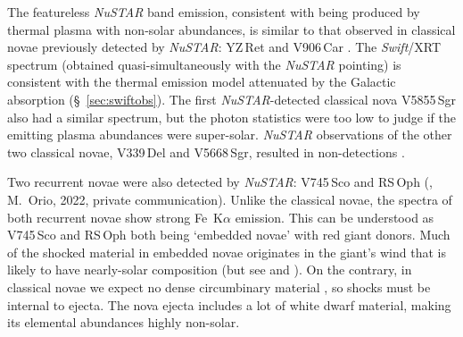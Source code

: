 \documentclass[a4paper,fleqn,usenatbib]{mnras}
\begin{document}
The featureless {\em NuSTAR} band emission, 
consistent with being produced by thermal plasma with non-solar abundances, 
is similar to that observed in classical novae previously detected by {\em NuSTAR}:
YZ\,Ret \citep{2022MNRAS.514.2239S} and V906\,Car \citep{2020MNRAS.497.2569S}. 
The {\em Swift}/XRT spectrum (obtained quasi-simultaneously with the {\em NuSTAR} pointing) 
is consistent with the thermal emission model attenuated by the Galactic absorption (\S~\ref{sec:swiftobs}). 
The first {\em NuSTAR}-detected classical nova V5855\,Sgr \citep{2019ApJ...872...86N} also
had a similar spectrum, but the photon statistics were too low to judge if
the emitting plasma abundances were super-solar. {\em NuSTAR} observations
of the other two classical novae, V339\,Del and V5668\,Sgr, resulted in
non-detections \citep{2018ApJ...852...62V}.

Two recurrent novae were also detected by {\em NuSTAR}: 
V745\,Sco \citep{2015MNRAS.448L..35O} and RS\,Oph
(\citealt{2021ATel14872....1L}, M.~Orio, 2022, private communication).
Unlike the classical novae, the spectra of both recurrent
novae show strong Fe~K$\alpha$ emission. This can be understood as V745\,Sco
and RS\,Oph both being `embedded novae' %
with red giant donors. Much of the shocked material in embedded novae 
originates in the giant's wind that is likely to have nearly-solar
composition (but see \citealt{2019MNRAS.490.3691D} and \citealt{2022ApJ...938...34O}). 
On the contrary, in classical novae we expect no dense circumbinary material
\citep{2014ApJ...786...68H},
so shocks must be internal to ejecta. The nova ejecta includes a lot of 
white dwarf material, making its elemental abundances highly non-solar.
\end{document}

